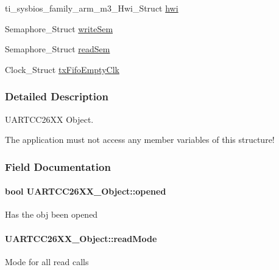 \begin{DoxyCompactItemize}
\item 
ti\+\_\+sysbios\+\_\+family\+\_\+arm\+\_\+m3\+\_\+\+Hwi\+\_\+\+Struct \hyperlink{struct_u_a_r_t_c_c26_x_x___object_adfa38511dd1f8c470bb7f80afdfcd6eb}{hwi}
\item 
Semaphore\+\_\+\+Struct \hyperlink{struct_u_a_r_t_c_c26_x_x___object_a216c349e650909bd84072c076051117d}{write\+Sem}
\item 
Semaphore\+\_\+\+Struct \hyperlink{struct_u_a_r_t_c_c26_x_x___object_ab81ce13969ecc77d764000ea53fb23d2}{read\+Sem}
\item 
Clock\+\_\+\+Struct \hyperlink{struct_u_a_r_t_c_c26_x_x___object_a97be7390556f78f9361505c4ee860469}{tx\+Fifo\+Empty\+Clk}
\end{DoxyCompactItemize}


\subsubsection{Detailed Description}
U\+A\+R\+T\+C\+C26\+X\+X Object. 

The application must not access any member variables of this structure! 

\subsubsection{Field Documentation}
\paragraph[{opened}]{\setlength{\rightskip}{0pt plus 5cm}bool U\+A\+R\+T\+C\+C26\+X\+X\+\_\+\+Object\+::opened}\label{struct_u_a_r_t_c_c26_x_x___object_aabff5933f6661e2ebdbd8b001a6c12d7}
Has the obj been opened 
\paragraph[{read\+Mode}]{ U\+A\+R\+T\+C\+C26\+X\+X\+\_\+\+Object\+::read\+Mode}\label{struct_u_a_r_t_c_c26_x_x___object_a6f41cd73c5e6a1ea8ccc0a45bc588043}
Mode for all read calls 
